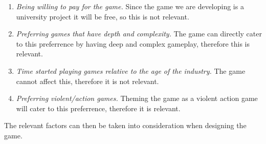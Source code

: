 \begin{enumerate}
\item \emph{Being willing to pay for the game.}
Since the game we are developing is a university project it will be free, so this is not relevant.

\item \emph{Preferring games that have depth and complexity.}
The game can directly cater to this preferrence by having deep and complex gameplay, therefore this is relevant.

\item \emph{Time started playing games relative to the age of the industry.}
The game cannot affect this, therefore it is not relevant.

\item \emph{Preferring violent/action games.}
Theming the game as a violent action game will cater to this preferrence, therefore it is relevant.
\end{enumerate}

The relevant factors can then be taken into consideration when designing the game.

